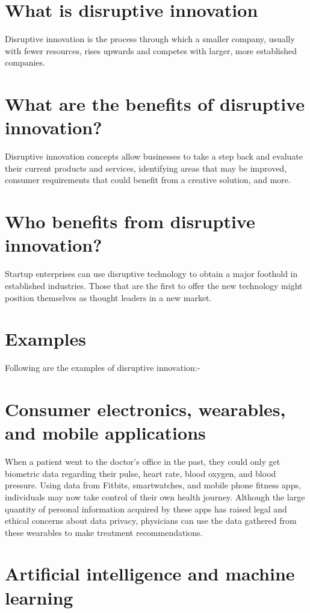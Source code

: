 \documentclass[12pt]{article}
\begin{document}
\section*{What is disruptive innovation}

Disruptive innovation is the process through which a smaller company, usually with fewer resources, rises upwards and competes with larger, more established companies.

\section*{What are the benefits of disruptive innovation?}

Disruptive innovation concepts allow businesses to take a step back and evaluate their current products and services, identifying areas that may be improved, consumer requirements that could benefit from a creative solution, and more.
\section*{Who benefits from disruptive innovation?}
Startup enterprises can use disruptive technology to obtain a major foothold in established industries. Those that are the first to offer the new technology might position themselves as thought leaders in a new market.

\section*{Examples}
Following are the examples of disruptive innovation:-

\section{Consumer electronics, wearables, and mobile applications}

When a patient went to the doctor's office in the past, they could only get biometric data regarding their pulse, heart rate, blood oxygen, and blood pressure. Using data from Fitbits, smartwatches, and mobile phone fitness apps, individuals may now take control of their own health journey. Although the large quantity of personal information acquired by these apps has raised legal and ethical concerns about data privacy, physicians can use the data gathered from these wearables to make treatment recommendations.

\section{Artificial intelligence and machine learning}
\end{document}

